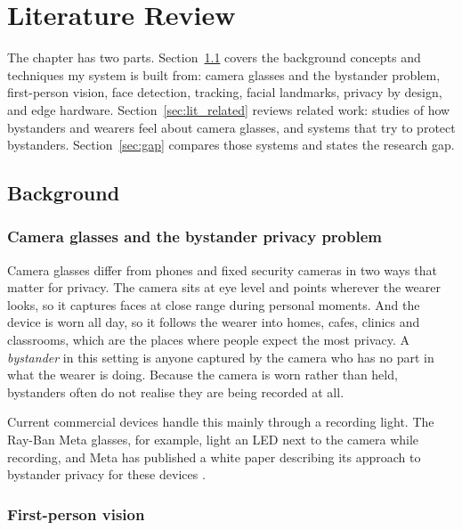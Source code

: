 \section{Literature Review}
\label{sec:lit}

The chapter has two parts. Section~\ref{sec:lit_bg} covers the background concepts and
techniques my system is built from: camera glasses and the bystander problem,
first-person vision, face detection, tracking, facial landmarks, privacy by design, and
edge hardware. Section~\ref{sec:lit_related} reviews related work: studies of how
bystanders and wearers feel about camera glasses, and systems that try to protect
bystanders. Section~\ref{sec:gap} compares those systems and states the research gap.

\subsection{Background}
\label{sec:lit_bg}

\subsubsection{Camera glasses and the bystander privacy problem}

Camera glasses differ from phones and fixed security cameras in two ways that matter for
privacy. The camera sits at eye level and points wherever the wearer looks, so it captures
faces at close range during personal moments. And the device is worn all day, so it
follows the wearer into homes, cafes, clinics and classrooms, which are the places where
people expect the most privacy. A \emph{bystander} in this setting is anyone captured by
the camera who has no part in what the wearer is doing. Because the camera is worn rather
than held, bystanders often do not realise they are being recorded at all.

Current commercial devices handle this mainly through a recording light. The Ray-Ban Meta
glasses, for example, light an LED next to the camera while recording, and Meta has
published a white paper describing its approach to bystander privacy for these devices
\cite{meta_bystander}.

\subsubsection{First-person vision}

